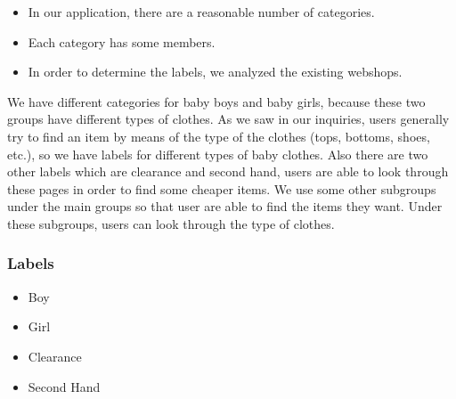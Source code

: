 \begin{itemize}
\item In our application, there are a reasonable number of categories.
\item Each category has some members.
\item In order to determine the labels, we analyzed the existing webshops.
\end{itemize}

We have different categories for baby boys and baby girls, because these two groups have different types of clothes. As we saw in our inquiries, users generally try to find an item by means of the type of the clothes (tops, bottoms, shoes, etc.), so we have labels for different types of baby clothes.
Also there are two other labels which are clearance and second hand, users are able to look through these pages in order to find some cheaper items.
We use some other subgroups under the main groups so that user are able to find the items they want. Under these subgroups, users can look through the type of clothes.

\subsubsection{Labels}
\begin{itemize}
\setlength{\itemsep}{-3pt}
\setlength{\parskip}{0pt}
\setlength{\parsep}{0pt}
 \item Boy
 \item Girl
 \item Clearance
 \item Second Hand
\end{itemize}

